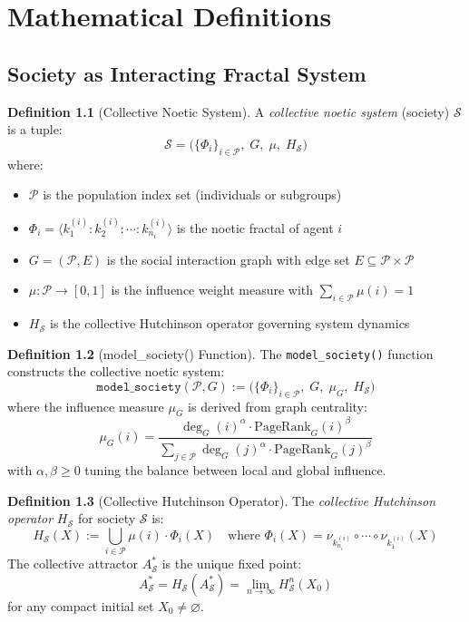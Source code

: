 \documentclass[11pt,twoside]{book}
\theoremstyle{definition}
\newtheorem{definition}{Definition}[chapter]
\theoremstyle{plain}
\theoremstyle{remark}
\newcommand{\Frac}{\Phi}
\begin{document}
\chapter{Mathematical Definitions}
\label{ch:se-definitions}

\section{Society as Interacting Fractal System}

\begin{definition}[Collective Noetic System]
\label{def:collective-noetic-system}
A \emph{collective noetic system} (society) $\mathcal{S}$ is a tuple:
\[
    \mathcal{S} = \bigl( \{\Frac_i\}_{i \in \mathcal{P}}, \; G, \; \mu, \; H_{\mathcal{S}} \bigr)
\]
where:
\begin{itemize}
    \item $\mathcal{P}$ is the population index set (individuals or subgroups)
    \item $\Frac_i = \langle k_1^{(i)} : k_2^{(i)} : \cdots : k_{n_i}^{(i)} \rangle$ is the noetic fractal of agent $i$
    \item $G = (\mathcal{P}, E)$ is the social interaction graph with edge set $E \subseteq \mathcal{P} \times \mathcal{P}$
    \item $\mu : \mathcal{P} \to [0,1]$ is the influence weight measure with $\sum_{i \in \mathcal{P}} \mu(i) = 1$
    \item $H_{\mathcal{S}}$ is the collective Hutchinson operator governing system dynamics
\end{itemize}
\end{definition}

\begin{definition}[model\_society() Function]
\label{def:model-society}
The \texttt{model\_society()} function constructs the collective noetic system:
\[
\boxed{
    \mathtt{model\_society}(\mathcal{P}, G) := \bigl( \{\Frac_i\}_{i \in \mathcal{P}}, \; G, \; \mu_G, \; H_{\mathcal{S}} \bigr)
}
\]
where the influence measure $\mu_G$ is derived from graph centrality:
\[
    \mu_G(i) = \frac{\deg_G(i)^{\alpha} \cdot \mathrm{PageRank}_G(i)^{\beta}}
    {\sum_{j \in \mathcal{P}} \deg_G(j)^{\alpha} \cdot \mathrm{PageRank}_G(j)^{\beta}}
\]
with $\alpha, \beta \geq 0$ tuning the balance between local and global influence.
\end{definition}

\begin{definition}[Collective Hutchinson Operator]
\label{def:collective-hutchinson}
The \emph{collective Hutchinson operator} $H_{\mathcal{S}}$ for society $\mathcal{S}$ is:
\[
    H_{\mathcal{S}}(X) := \bigcup_{i \in \mathcal{P}} \mu(i) \cdot \Frac_i(X)
    \quad \text{where } \Frac_i(X) = \nu_{k_{n_i}^{(i)}} \circ \cdots \circ \nu_{k_1^{(i)}}(X)
\]
The collective attractor $A_{\mathcal{S}}^*$ is the unique fixed point:
\[
    A_{\mathcal{S}}^* = H_{\mathcal{S}}(A_{\mathcal{S}}^*) = \lim_{n \to \infty} H_{\mathcal{S}}^n(X_0)
\]
for any compact initial set $X_0 \neq \varnothing$.
\end{definition}
\end{document}
